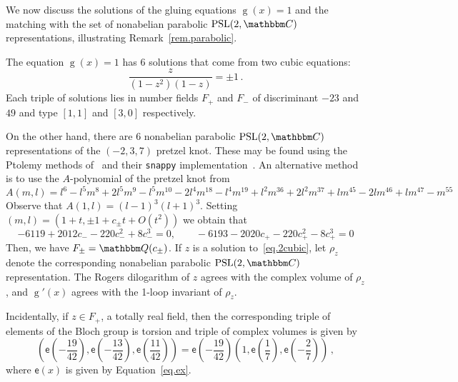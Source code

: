 \documentclass[12pt]{amsart}
\theoremstyle{definition}
\def\BQ{\mathbbm Q}
\def\BC{\mathbbm C}
\def\PSL{\mathrm{PSL}}
\begin{document}
We now discuss the solutions of the gluing equations $\operatorname{g}(x)=1$ and the
matching with the set of nonabelian parabolic $\PSL(2,\BC)$ representations,
illustrating Remark~\ref{rem.parabolic}.

The equation $\operatorname{g}(x)=1$ has 6 solutions that come from two cubic equations:
\begin{equation}
\label{eq.2cubic}
\frac{z}{(1-z^2)(1-z)} = \pm 1 \,.
\end{equation}
Each triple of solutions lies in number fields $F_+$ and $F_-$ 
of discriminant $-23$ and $49$ and type $[1,1]$ and $[3,0]$ respectively.

On the other hand, there are 6 nonabelian parabolic $\PSL(2,\BC)$ 
representations of the $(-2,3,7)$ pretzel knot. These may be found using
the Ptolemy methods of~\cite{ptolemy} and their {\tt snappy} 
implementation~\cite{snappy}. An alternative method is to use 
the $A$-polynomial of the pretzel knot from~\cite{Culler:Apoly}
$$
A(m,l)=l^6 - l^5 m^8 + 2 l^5 m^9 - l^5 m^{10} - 2 l^4 m^{18} - l^4 m^{19} + 
l^2 m^{36} + 2 l^2 m^{37} + l m^{45} - 2 l m^{46} + l m^{47} - m^{55}
$$
Observe that $A(1,l)=(l-1)^3(l+1)^3$. Setting 
$(m,l)=(1+t,\pm 1+c_{\pm} t + O(t^2))$
we obtain that
$$
-6119 + 2012 c_- - 220 c_-^2 + 8 c_-^3 =0, \qquad
-6193 - 2020 c_+ - 220 c_+^2 - 8 c_+^3 =0
$$
Then, we have $F_\pm=\BQ(c_\pm)$. If $z$ is a solution to~\eqref{eq.2cubic},
let $\rho_z$ denote the corresponding nonabelian parabolic $\PSL(2,\BC)$
representation. The Rogers dilogarithm of $z$ agrees with the complex volume
of $\rho_z$, and $\operatorname{g}'(x)$ agrees with the 1-loop invariant of $\rho_z$.

Incidentally, if $z \in F_+$, a totally real field, then the corresponding
triple of elements of the Bloch group is torsion and triple of complex volumes
is given by 
$$
\left(\mathsf{e}\left(-\frac{19}{42}\right), 
\mathsf{e}\left(-\frac{13}{42}\right),
\mathsf{e}\left(\frac{11}{42}\right) \right)= 
\mathsf{e}\left(-\frac{19}{42}\right) 
\left(1, 
\mathsf{e}\left(\frac{1}{7}\right),
\mathsf{e}\left(-\frac{2}{7}\right) \right)
\,,
$$ 
where $\mathsf{e}(x)$ is given by Equation~\eqref{eq.ex}. 

\end{document}
